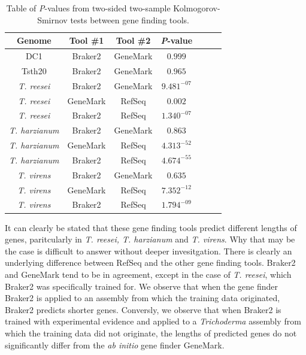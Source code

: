 \begin{table}
  \begin{center}
    \begin{tabular}{|c|c|c|c|c|c|c|}
      \hline
      Genome & Tool \#1 & Tool \#2 & \textit{P}-value  \\ \hline
      DC1 & Braker2 & GeneMark & $0.999$ \\ \hline
      Tsth20 & Braker2 & GeneMark & $0.965$ \\ \hline
      \textit{T. reesei} & Braker2 & GeneMark & $9.481^{-07}$ \\ \hline
      \textit{T. reesei} & GeneMark & RefSeq & $0.002$ \\ \hline
      \textit{T. reesei} & Braker2 & RefSeq & $1.340^{-07}$ \\ \hline
      \textit{T. harzianum} & Braker2 & GeneMark & $0.863$ \\ \hline
      \textit{T. harzianum} & GeneMark & RefSeq & $4.313^{-52}$ \\ \hline
      \textit{T. harzianum} & Braker2 & RefSeq & $4.674^{-55}$ \\ \hline
      \textit{T. virens} & Braker2 & GeneMark & $0.635$ \\ \hline
      \textit{T. virens} & GeneMark & RefSeq & $7.352^{-12}$ \\ \hline
      \textit{T. virens} & Braker2 & RefSeq & $1.794^{-09}$ \\ \hline
    \end{tabular}
  \end{center}
  \caption{Table of \textit{P}-values from two-sided two-sample
    Kolmogorov-Smirnov tests between gene finding tools.}
  \label{table:ks-2s}
\end{table}

It can clearly be stated that these gene finding tools predict
different lengths of genes, paritcularly in \textit{T. reesei,
  T. harzianum} and \textit{T. virens}. Why that may be the case is
difficult to answer without deeper invesitgation. There is clearly an
underlying difference between RefSeq and the other gene finding
tools. Braker2 and GeneMark tend to be in agreement, except in the
case of \textit{T. reesei}, which Braker2 was specifically trained
for. We observe that when the gene finder Braker2 is applied to an
assembly from which the training data originated, Braker2 predicts
shorter genes. Conversly, we observe that when Braker2 is trained with
experimental evidence and applied to a \textit{Trichoderma} assembly
from which the training data did not originate, the lengths of
predicted genes do not significantly differ from the \textit{ab
  initio} gene finder GeneMark.
